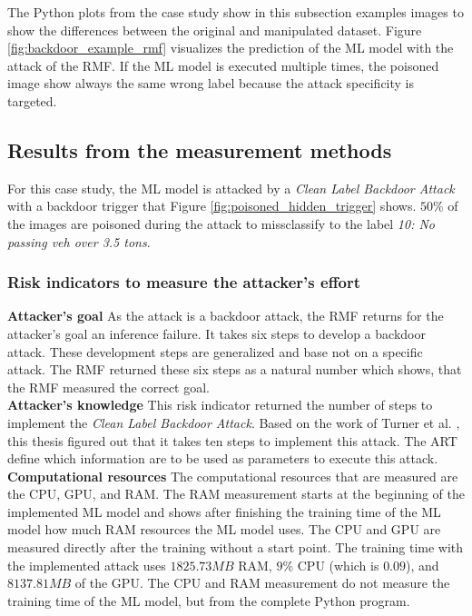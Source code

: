 The Python plots from the case study show in this subsection examples images to show the differences between the original and manipulated dataset. Figure \ref{fig:backdoor_example_rmf} visualizes the prediction of the ML model with the attack of the RMF. If the ML model is executed multiple times, the poisoned image show always the same wrong label because the attack specificity is targeted.

\subsection{Results from the measurement methods}

For this case study, the ML model is attacked by a \textit{Clean Label Backdoor Attack} with a backdoor trigger that Figure \ref{fig:poisoned_hidden_trigger} shows. $50\%$ of the images are poisoned during the attack to missclassify to the label \textit{10: No passing veh over 3.5 tons}.

\subsubsection*{Risk indicators to measure the attacker's effort}

\noindent\textbf{Attacker's goal} As the attack is a backdoor attack, the RMF returns for the attacker's goal an inference failure. It takes six steps to develop a backdoor attack. These development steps are generalized and base not on a specific attack. The RMF returned these six steps as a natural number which shows, that the RMF measured the correct goal. \\

\noindent\textbf{Attacker's knowledge} This risk indicator returned the number of steps to implement the \textit{Clean Label Backdoor Attack}. Based on the work of Turner et al. \cite{turner2018clean}, this thesis figured out that it takes ten steps to implement this attack. The ART \cite{art2018} define which information are to be used as parameters to execute this attack. \\

\noindent\textbf{Computational resources} The computational resources that are measured are the CPU, GPU, and RAM. The RAM measurement starts at the beginning of the implemented ML model and shows after finishing the training time of the ML model how much RAM resources the ML model uses. The CPU and GPU are measured directly after the training without a start point. The training time with the implemented attack uses $1825.73MB$ RAM, $9\%$ CPU (which is $0.09$), and $8137.81MB$ of the GPU. The CPU and RAM measurement do not measure the training time of the ML model, but from the complete Python program. \\ \\

